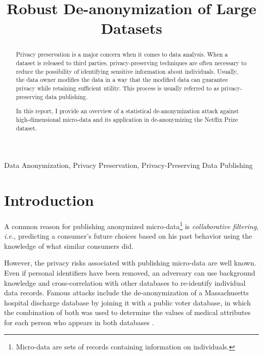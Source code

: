\documentclass[conference]{IEEEtran}
\begin{document}
\title{Robust De-anonymization of Large Datasets}

\author{
}

\maketitle

\begin{abstract}
Privacy preservation is a major concern when it comes to data analysis. When a dataset is released 
to third parties, privacy-preserving techniques are often necessary to reduce the possibility of 
identifying sensitive information about individuals. Usually, the data owner modifies the data in a 
way that the modified data can guarantee privacy while retaining sufficient utility. This process 
is usually referred to as privacy-preserving data publishing.

In this report, I provide an overview of a statistical de-anonymization attack against 
high-dimensional micro-data and its application in de-anonymizing the Netflix Prize dataset.\\
\end{abstract}

\begin{IEEEkeywords}
Data Anonymization, Privacy Preservation, Privacy-Preserving Data Publishing
\end{IEEEkeywords}

\section{Introduction}

A common reason for publishing anonymized micro-data\footnote{Micro-data are sets of records 
containing information on individuals.} is \textit{collaborative filtering}, \textit{i.e.}, 
predicting a consumer's future choices based on his past behavior using the knowledge of what 
similar consumers did. 

However, the privacy risks associated with publishing micro-data are well known. Even if personal 
identifiers have been removed, an adversary can use background knowledge and cross-correlation with 
other databases to re-identify individual data records. Famous attacks include the de-anonymization 
of a Massachusetts hospital discharge database by joining it with a public voter database, in which 
the combination of both was used to determine the values of medical attributes for each person who 
appears in both databases \cite{sweeney_2021}.
\end{document}
